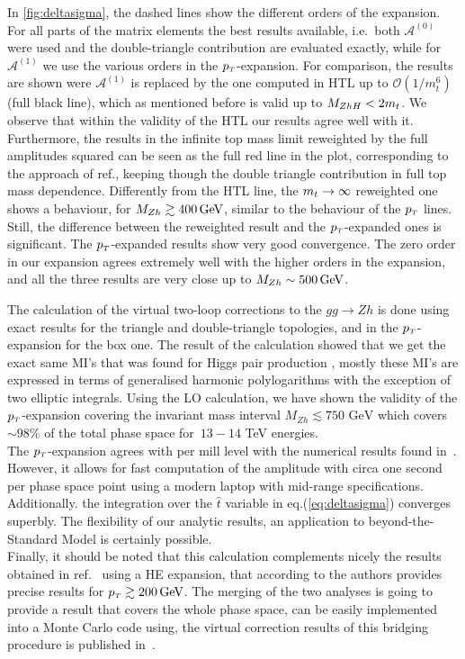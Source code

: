 In \autoref{fig:deltasigma}, the dashed lines show
 the different orders of the expansion. 
For all parts of the matrix elements the best results
available, i.e.~both $\mathcal{A}^{(0)}$ were used and the double-triangle
contribution are evaluated exactly, while for
$\mathcal{A}^{(1)}$ we use the various orders in the $p_{\scriptscriptstyle T}$-expansion.
For comparison, the results are shown were
$\mathcal{A}^{(1)}$ is replaced by the one computed in HTL up to
$\mathcal{O}(1/m_t^6)$ (full black line), which as mentioned before is valid
up to $M_{ZhH}< 2 m_t$. We observe that within the validity of the HTL our
results agree well with it.
Furthermore, the results in the infinite top
mass limit reweighted by the full amplitudes squared can be seen as the full red line in the plot, corresponding to the
approach of ref.\cite{Altenkamp:2012sx}, keeping though the double triangle
contribution in full top mass dependence. 
Differently from the HTL line, the $m_t \to \infty$ reweighted one
shows a behaviour, for  $M_{Zh} \gtrsim 400\,\textrm{GeV}$, similar to the behaviour of
the $p_{\scriptscriptstyle T}$ lines. Still,   the difference
between the reweighted result and the $p_{\scriptscriptstyle T}$-expanded ones is  significant.
The $p_{\scriptscriptstyle T}$-expanded results show
very good convergence.  The zero order in our expansion agrees
extremely well with the higher orders in the expansion, and all the
three results are very close up to $M_{Zh} \sim 500\,\textrm{GeV}$.
\par  The calculation of the virtual two-loop corrections to the $gg \to Zh$ is done using exact results for the triangle and double-triangle topologies, and in the $p_{\scriptscriptstyle T}$-expansion for the box one.  The result of the calculation showed that we get the exact same MI's that was found for Higgs pair production \cite{Bonciani:2018omm} , mostly these MI's are expressed in terms of generalised harmonic polylogarithms with the
exception of two elliptic integrals. Using the LO calculation, we have shown the validity of the $p_{\scriptscriptstyle T}$-expansion covering the invariant mass interval  $M_{Zh}\lesssim 750\text{ GeV}$ which covers $\sim 98\%$ of the total phase space for~$13-14$ TeV energies.\\
The $p_{\scriptscriptstyle T}$-expansion agrees with per mill level with the numerical results found in~\cite{Chen:2020gae}. However, it allows for fast computation of the amplitude with circa one second per phase space point using a modern laptop with mid-range specifications. Additionally. the integration over the $\hat{t}$ variable
in eq.(\ref{eq:deltasigma}) converges superbly.  The flexibility of our analytic
results, an application to beyond-the-Standard Model is certainly
possible.\\ 
Finally, it should be noted that this calculation complements
nicely the results obtained in ref.~\cite{Davies:2020drs} using a HE
expansion, that according to the authors provides precise results for
$p_{\scriptscriptstyle T} \gtrsim 200\,\textrm{GeV}$. The merging of the two analyses is going to provide
a result that covers the whole phase space, can be easily implemented into a
Monte Carlo code using, the virtual correction results of this bridging procedure is published in~\cite{Bellafronte:2022jmo}.